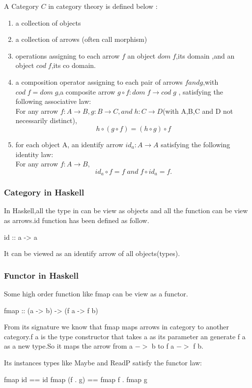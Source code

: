 A Category $C $ in category theory is defined below :
\begin{enumerate}
\item a collection of objects 
\item a collection of arrows (often call morphism) 
\item operations assigning to each arrow $f$ an object $dom\;f$,its domain ,and an object $cod\;f$,its co domain.
\item a composition operator assigning to each pair of arrows $f and g$,with $cod\;f = dom\;g$,a composite arrow $ g \circ f:dom\;f \rightarrow  cod\;g$ , satisfying the following associative law: \\
For any arrow $f: A \rightarrow B,g:B \rightarrow C,and\;h: C\rightarrow D$(with A,B,C and D not necessarily distinct),
$$h\circ (g\circ f) = (h\circ g)\circ f$$
\item for each object A, an identify arrow $id_{a}: A \rightarrow A$ satisfying the following identity law:\\
For any arrow $ f: A \rightarrow B,$ 
$$ id_{a} \circ f = f  \;and\;  f\circ id_{a} = f. $$
\end{enumerate}\cite{pierce_basic_1991}


\subsubsection*{Category in Haskell}
In Haskell,all the type in can be view as objects and all the function can be view as arrows.id function has been defined as follow.
\begin{hcode}
 id :: a -> a
\end{hcode}
It can be viewed as an identify arrow of all objects(types).
\subsubsection*{Functor in Haskell}
Some high order function like fmap can be view as a functor.
\begin{hcode}
fmap :: (a -> b) -> (f a -> f b)
\end{hcode}
From its signature we know that fmap maps arrows in category to another category.f a is the type constructor that takes a as its parameter an generate f a as a new type.So it maps the arrow from a $->$ b to f a $->$ f b.

Its instances types like Maybe and ReadP satisfy the functor law:
\begin{hcode}
fmap id  ==  id
fmap (f . g)  ==  fmap f . fmap g
\end{hcode}

